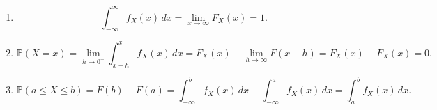 \documentclass{huhtakm-template-book-v2}
\newcommand{\prob}{\mathbb{P}}
\begin{document}
    \begin{proofing}
        \begin{enumerate}
            \item 
            \begin{equation*}
                \int_{-\infty}^{\infty} f_{X}(x)\,dx = \lim_{x \to \infty}F_{X}(x) = 1.
            \end{equation*}
            \item
            \begin{equation*}
                \prob(X = x) = \lim_{h \to 0^{+}}\int_{x-h}^{x}f_{X}(x)\,dx = F_{X}(x)-\lim_{h \to \infty}F(x-h) = F_{X}(x)-F_{X}(x) = 0.
            \end{equation*}
            \item
            \begin{equation*}
                \prob(a \leq X \leq b) = F(b)-F(a) = \int_{-\infty}^{b}f_{X}(x)\,dx-\int_{-\infty}^{a}f_{X}(x)\,dx = \int_{a}^{b}f_{X}(x)\,dx.
            \end{equation*}
        \end{enumerate}
    \end{proofing}
    \newpage
\end{document}
